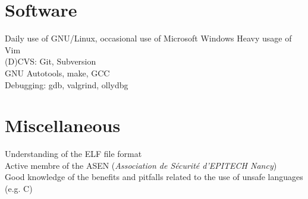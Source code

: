 \documentclass[]{friggeri-cv}
\begin{document}
\section{Software}
\begin{entrylist}
  \entry
    {}
    {Daily use of GNU/Linux, occasional use of Microsoft Windows}
    {}
    {Heavy usage of Vim\\
    (D)CVS: Git, Subversion\\
    GNU Autotools, make, GCC\\
    Debugging: gdb, valgrind, ollydbg}

\end{entrylist}

\section{Miscellaneous}
\begin{entrylist}
  \entry
    {}
    {}
    {}
    {Understanding of the ELF file format\\
    Active membre of the ASEN (\emph{Association de Sécurité d'EPITECH Nancy})\\
    Good knowledge of the benefits and pitfalls related to the use of unsafe languages (e.g. C)}
\end{entrylist}
\end{document}
